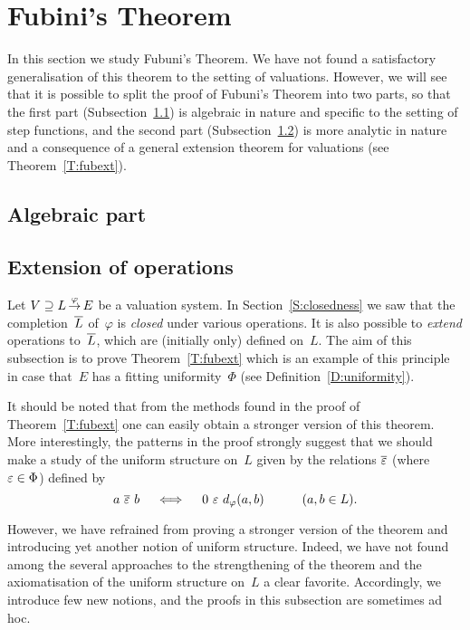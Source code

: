 \documentclass[main.tex]{subfiles}
\begin{document}
\section{Fubini's Theorem}
\label{S:fub}
In this section we study Fubuni's Theorem.
We have not found a satisfactory generalisation of this theorem
to the setting of valuations.
However,
we will see that it is possible to split
the proof of Fubuni's Theorem
into two parts,
so that the first part (Subsection~\ref{SS:fub_part1})
is algebraic in nature
and specific to the setting of step functions,
and the second part (Subsection~\ref{SS:fub_part2}) is more analytic in nature
and a consequence of a
general extension theorem for valuations (see Theorem~\ref{T:fubext}).
\subsection{Algebraic part}
\label{SS:fub_part1}

\subsection{Extension of operations}
\label{SS:fub_part2}
Let $V \supseteq L\,\smash{\stackrel{\varphi}{\rightarrow}}\,E$ be a valuation system.
In Section~\ref{S:closedness}
we saw that the completion~$\overline{L}$ of~$\varphi$ is \emph{closed} under
various operations.
It is also possible to \emph{extend} operations
 to~$\overline{L}$, which are (initially only) defined on~$L$.
The aim of this subsection is to prove Theorem~\ref{T:fubext}
which is an example of this principle
in case that~$E$ has a fitting uniformity~$\Phi$
(see Definition~\ref{D:uniformity}).

It should be noted that from the methods
found in the proof of Theorem~\ref{T:fubext}
one can easily obtain a stronger version of this theorem.
More interestingly,
the patterns in the proof strongly suggest that
we should make a study of the uniform structure on~$L$
given by the relations $\overline{\varepsilon}$ (where $\varepsilon\in\Phi$) defined by
\begin{equation*}
a \ \ol{\ve}\ b \quad\iff\quad 0\ \ve\ \ld\varphi(a,b)\qquad\quad(a,b\in L).
\end{equation*}

However, we have refrained from proving a stronger version of the theorem
and introducing yet another notion of uniform structure.
Indeed,
we have not found among the several approaches to the strengthening
of the theorem and the axiomatisation of the uniform structure on~$L$
a clear favorite.
Accordingly,
we introduce few new notions,
and the proofs in this subsection are sometimes ad hoc.
\end{document}
